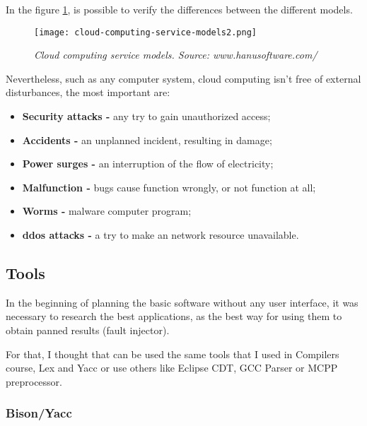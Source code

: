 In the figure \ref{fig:cloudcomputingservicemodels}, is possible to verify the differences between the different models.

\begin{figure}[!ht]
\begin{center}
\texttt{[image: cloud-computing-service-models2.png]}
\caption{\small \sl Cloud computing service models. \textit{Source: www.hanusoftware.com/}\label{fig:cloudcomputingservicemodels}}
\end{center}
\end{figure}

Nevertheless, such as any computer system, cloud computing isn't free of external disturbances\cite{wolter2012resilience}, the most important are:
\begin{itemize}
 	\item \textbf{Security attacks - } any try to gain unauthorized access;
 	\item \textbf{Accidents - } an unplanned incident, resulting in damage;
 	\item \textbf{Power surges - } an interruption of the flow of electricity;
 	\item \textbf{Malfunction - } bugs cause function wrongly, or not function at all;
 	\item \textbf{Worms - } malware computer program;
 	\item \textbf{\acl{ddos} attacks - } a try to make an network resource unavailable.
 \end{itemize}

\clearpage
\subsection{Tools}

In the beginning of planning the basic software without any user interface, it was necessary to research the best applications, as the best way for using them to obtain panned results (fault injector).

For that, I thought that can be used the same tools that I used in Compilers course, Lex and Yacc or use others like Eclipse CDT, GCC Parser or MCPP preprocessor.\\


\subsubsection{Bison/Yacc}


